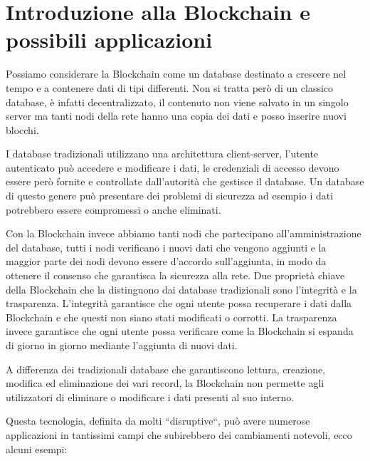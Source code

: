 \documentclass[12pt]{report}
\begin{document}
\section{Introduzione alla Blockchain e possibili applicazioni}

Possiamo considerare la Blockchain come un database destinato a crescere nel tempo e a contenere dati di tipi differenti.
Non si tratta però di un classico database, è infatti decentralizzato, il contenuto non viene salvato in un singolo server ma tanti nodi della rete hanno una copia dei dati e posso inserire nuovi blocchi.

I database tradizionali utilizzano una architettura client-server, l'utente autenticato può accedere e modificare i dati, le credenziali di accesso devono essere però fornite e controllate dall'autorità che gestisce il database. 
Un database di questo genere può presentare dei problemi di sicurezza ad esempio i dati potrebbero essere compromessi o anche eliminati.

Con la Blockchain invece abbiamo tanti nodi che partecipano all'amministrazione del database, tutti i nodi verificano i nuovi dati che vengono aggiunti e la maggior parte dei nodi devono essere d'accordo sull'aggiunta, in modo da ottenere il consenso che garantisca la sicurezza alla rete.
Due proprietà chiave della Blockchain che la distinguono dai database tradizionali sono l'integrità e la trasparenza.
L'integrità garantisce che ogni utente possa recuperare i dati dalla Blockchain e che questi non siano stati modificati o corrotti.
La trasparenza invece garantisce che ogni utente possa verificare come la Blockchain si espanda di giorno in giorno mediante l'aggiunta di nuovi dati.

A differenza dei tradizionali database che garantiscono lettura, creazione, modifica ed eliminazione dei vari record, la Blockchain non permette agli utilizzatori di eliminare o modificare i dati presenti al suo interno.

Questa tecnologia, definita da molti ``disruptive``, può avere numerose applicazioni in tantissimi campi che subirebbero dei cambiamenti notevoli, ecco alcuni esempi:
\end{document}
